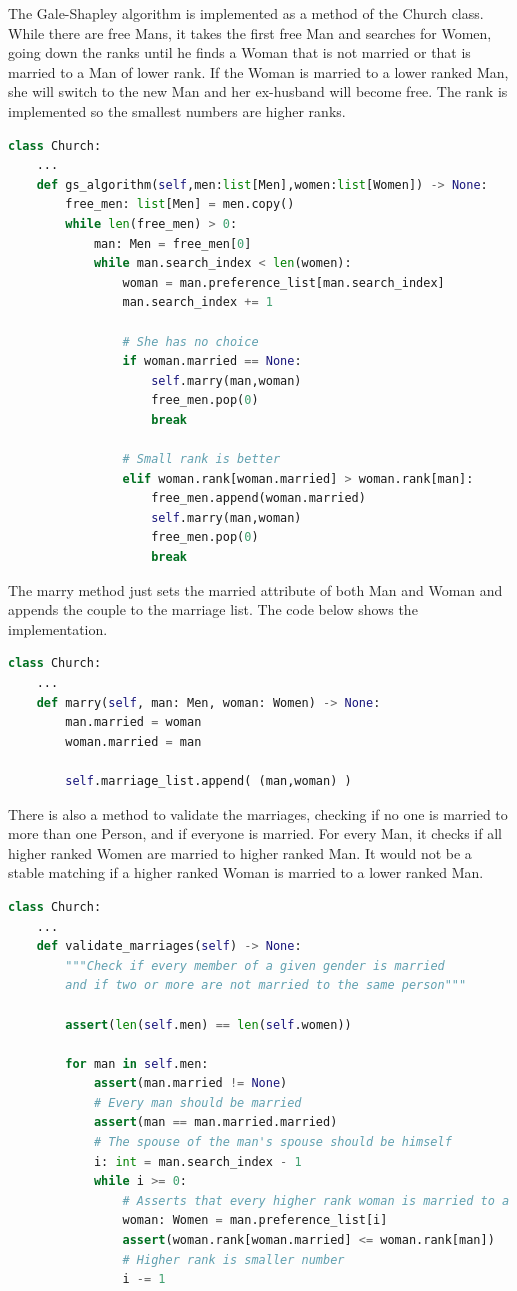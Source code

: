 \documentclass[a4paper,12pt,twocolumn]{article}
\begin{document}
The Gale-Shapley algorithm is implemented as a method of the Church class.
While there are free Mans, it takes the first free Man and searches for Women,
going down the ranks until he finds a Woman that is not married or that is married to a Man of lower rank.
If the Woman is married to a lower ranked Man, she will switch to the new Man and her ex-husband will become free.
The rank is implemented so the smallest numbers are higher ranks.

\begin{lstlisting}[float=htbp,language=Python]
class Church:
 	...
	def gs_algorithm(self,men:list[Men],women:list[Women]) -> None:
		free_men: list[Men] = men.copy()
		while len(free_men) > 0:
			man: Men = free_men[0]
			while man.search_index < len(women):
				woman = man.preference_list[man.search_index]
				man.search_index += 1

				# She has no choice
				if woman.married == None:
					self.marry(man,woman)
					free_men.pop(0)
					break
				
				# Small rank is better
				elif woman.rank[woman.married] > woman.rank[man]:
					free_men.append(woman.married)
					self.marry(man,woman)
					free_men.pop(0)
					break
\end{lstlisting}

The marry method just sets the married attribute of both Man and Woman and appends the couple to the marriage list.
The code below shows the implementation.

\begin{lstlisting}[float=htbp,language=Python]
class Church:
 	...
	def marry(self, man: Men, woman: Women) -> None:
		man.married = woman
		woman.married = man

		self.marriage_list.append( (man,woman) )
\end{lstlisting}

There is also a method to validate the marriages, checking if no one is married to more than one Person,
and if everyone is married.
For every Man, it checks if all higher ranked Women are married to higher ranked Man.
It would not be a stable matching if a higher ranked Woman is married to a lower ranked Man.

\begin{lstlisting}[float=htbp,language=Python]
class Church:
 	...
	def validate_marriages(self) -> None:
		"""Check if every member of a given gender is married
		and if two or more are not married to the same person"""

		assert(len(self.men) == len(self.women))

		for man in self.men:
			assert(man.married != None)			
			# Every man should be married
			assert(man == man.married.married)	
			# The spouse of the man's spouse should be himself
			i: int = man.search_index - 1
			while i >= 0:
				# Asserts that every higher rank woman is married to a higher rank man
				woman: Women = man.preference_list[i]
				assert(woman.rank[woman.married] <= woman.rank[man]) 
				# Higher rank is smaller number
				i -= 1
\end{lstlisting}
\end{document}
